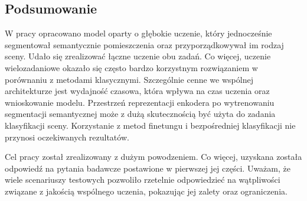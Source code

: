 \subsection{Podsumowanie}

W pracy opracowano model oparty o głębokie uczenie, który jednocześnie segmentował semantycznie pomieszczenia oraz przyporządkowywał im rodzaj sceny. Udało się zrealizować łączne uczenie obu zadań. Co więcej, uczenie wielozadaniowe okazało się często bardzo korzystnym rozwiązaniem w porównaniu z metodami klasycznymi. Szczególnie cenne we wspólnej architekturze jest wydajność czasowa, która wpływa na czas uczenia oraz wnioskowanie modelu. Przestrzeń reprezentacji enkodera po wytrenowaniu segmentacji semantycznej może z dużą skutecznością być użyta do zadania klasyfikacji sceny. Korzystanie z metod finetungu i bezpośredniej klasyfikacji nie przynosi oczekiwanych rezultatów.

Cel pracy został zrealizowany z dużym powodzeniem. Co więcej, uzyskana została odpowiedź na pytania badawcze postawione w pierwszej jej części. Uważam, że wiele scenariuszy testowych pozwoliło rzetelnie odpowiedzieć na wątpliwości związane z jakością wspólnego uczenia, pokazując jej zalety oraz ograniczenia.










